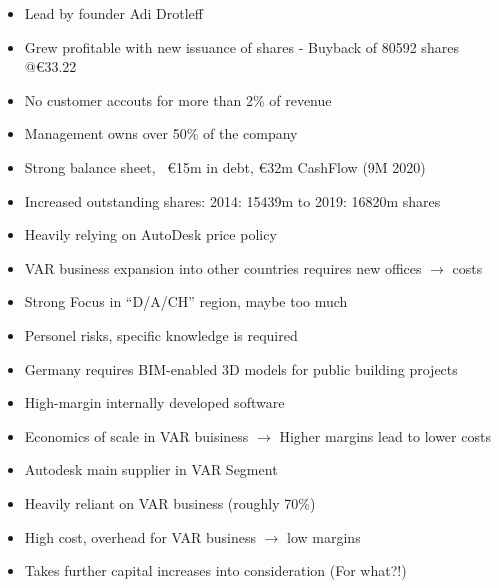 \documentclass{company_analysis}
\begin{document}
\swot
    { %
    \begin{itemize}[leftmargin=*,noitemsep]
        \item Lead by founder Adi Drotleff
        \item Grew profitable with new issuance of shares - Buyback of \num{80592} shares @\euro\num{33,22}
        \item No customer accouts for more than 2\% of revenue
        \item Management owns  over 50\% of the company
        \item Strong balance sheet, ~\euro\num{15}m in debt, \euro\num{32}m CashFlow (9M 2020)
    \end{itemize}
    }
    { %
    \begin{itemize}[leftmargin=*, noitemsep]
        \item Increased outstanding shares: 2014: \num{15439}m to 2019: \num{16820}m shares
        \item Heavily relying on AutoDesk price policy
        \item VAR business expansion into other countries requires new offices $\rightarrow$ costs
        \item Strong Focus in \enquote{D/A/CH} region, maybe too much
        \item Personel risks, specific knowledge is required
    \end{itemize}
    }
    { %
    \begin{itemize}[leftmargin=*,noitemsep]
        \item Germany requires BIM-enabled 3D models for public building projects
        \item High-margin internally developed software
        \item Economics of scale in VAR buisiness $\rightarrow$ Higher margins lead to lower costs
    \end{itemize}
    }
    { %
    \begin{itemize}[leftmargin=*,noitemsep]
        \item Autodesk main supplier in VAR Segment
        \item Heavily reliant on VAR business (roughly \num{70}\%)
        \item High cost, overhead for VAR business $\rightarrow$ low margins
        \item Takes further capital increases into consideration (For what?!)
    \end{itemize}
    }


\newpage
{}
\end{document}

